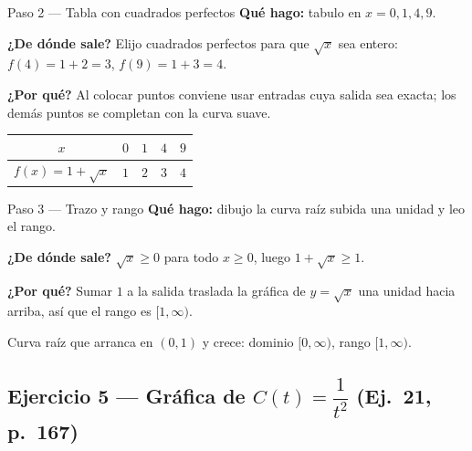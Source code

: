 \documentclass[11pt]{article}
\begin{document}
\begin{paso}{Paso 2 --- Tabla con cuadrados perfectos}
\textbf{Qué hago:} tabulo en $x=0,1,4,9$.

\textbf{¿De dónde sale?} Elijo cuadrados perfectos para que $\sqrt{x}$ sea entero: $f(4)=1+2=3$, $f(9)=1+3=4$.

\textbf{¿Por qué?} Al colocar puntos conviene usar entradas cuya salida sea exacta; los demás puntos se completan con la curva suave.

\begin{center}
\begin{tabular}{|c|c|c|c|c|}
\hline
$x$ & $0$ & $1$ & $4$ & $9$\\\hline
$f(x)=1+\sqrt{x}$ & $1$ & $2$ & $3$ & $4$\\\hline
\end{tabular}
\end{center}
\end{paso}

\begin{paso}{Paso 3 --- Trazo y rango}
\textbf{Qué hago:} dibujo la curva raíz subida una unidad y leo el rango.

\textbf{¿De dónde sale?} $\sqrt{x}\ge 0$ para todo $x\ge0$, luego $1+\sqrt{x}\ge 1$.

\textbf{¿Por qué?} Sumar $1$ a la salida traslada la gráfica de $y=\sqrt{x}$ una unidad hacia arriba, así que el rango es $[1,\infty)$.

\begin{center}
\end{center}
\end{paso}

\begin{resp}
Curva raíz que arranca en $(0,1)$ y crece: dominio $[0,\infty)$, rango $[1,\infty)$.
\end{resp}

\subsection*{Ejercicio 5 — Gráfica de $C(t)=\dfrac{1}{t^2}$ (Ej.~21, p.~167)}
\end{document}
